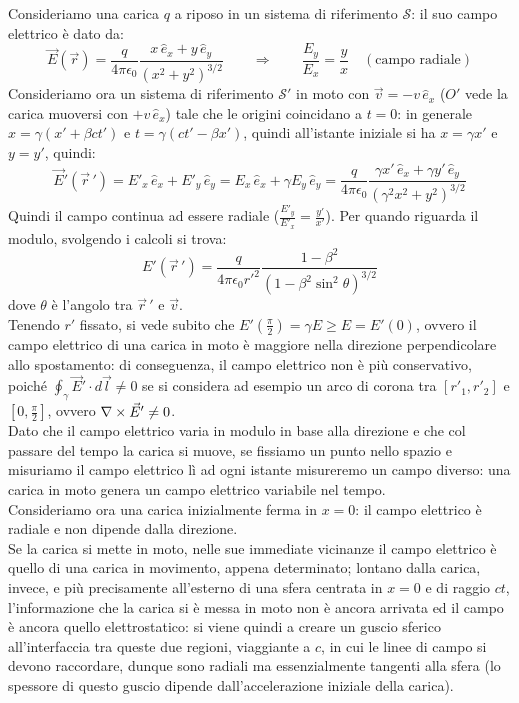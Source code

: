\documentclass[]{article}
\begin{document}
Consideriamo una carica $ q $ a riposo in un sistema di riferimento $	\mathcal{S} $: il suo campo elettrico è dato da:
\begin{equation}
	\vec{E}(\vec{r}) = \frac{q}{4\pi\epsilon_0} \frac{x\,\hat{e}_x + y\,\hat{e}_y}{(x^2+y^2)^{3/2}} \qquad\Longrightarrow\qquad \frac{E_y}{E_x} = \frac{y}{x} \quad (\text{campo radiale})
	\label{eq:30}
\end{equation} 
Consideriamo ora un sistema di riferimento $ \mathcal{S}' $ in moto con $ \vec{v} = -v\,\hat{e}_x $ ($ O' $ vede la carica muoversi con $ +v\,\hat{e}_x $) tale che le origini coincidano a $ t = 0 $: in generale $ x = \gamma (x' + \beta ct') $ e $ t = \gamma (ct' - \beta x') $, quindi all'istante iniziale si ha $ x = \gamma x' $ e $ y = y' $, quindi:
\begin{equation}
	\vec{E}'(\vec{r}\,') = E'_x\,\hat{e}_x + E'_y\,\hat{e}_y = E_x\,\hat{e}_x + \gamma E_y\,\hat{e}_y = \frac{q}{4\pi\epsilon_0} \frac{\gamma x' \,\hat{e}_x + \gamma y' \,\hat{e}_y}{(\gamma^2x^2+y^2)^{3/2}}
	\label{eq:31}
\end{equation}
Quindi il campo continua ad essere radiale ($ \frac{E'_y}{E'_x} = \frac{y'}{x'} $). Per quando riguarda il modulo, svolgendo i calcoli si trova:
\begin{equation}
	E'(\vec{r}\,') = \frac{q}{4\pi\epsilon_0 r'^2} \frac{1-\beta^2}{(1 - \beta^2\sin^2\theta)^{3/2}}
	\label{eq:32}
\end{equation}
dove $ \theta $ è l'angolo tra $ \vec{r}\,' $ e $ \vec{v} $. \\ 
%
Tenendo $ r' $ fissato, si vede subito che $ E'(\frac{\pi}{2}) = \gamma E \ge E = E'(0) $, ovvero il campo elettrico di una carica in moto è maggiore nella direzione perpendicolare allo spostamento: di conseguenza, il campo elettrico non è più conservativo, poiché $ \oint_{\gamma}\vec{E}'\cdot d\vec{l} \neq 0 $ se si considera ad esempio un arco di corona tra $ [r'_1,r'_2] $ e $ [0,\frac{\pi}{2}] $, ovvero $ \nabla\times\vec{E}' \neq 0 $. \\ 
%
Dato che il campo elettrico varia in modulo in base alla direzione e che col passare del tempo la carica si muove, se fissiamo un punto nello spazio e misuriamo il campo elettrico lì ad ogni istante misureremo un campo diverso: una carica in moto genera un campo elettrico variabile nel tempo. \\ 
%
Consideriamo ora una carica inizialmente ferma in $ x = 0 $: il campo elettrico è radiale e non dipende dalla direzione. \\Se la carica si mette in moto, nelle sue immediate vicinanze il campo elettrico è quello di una carica in movimento, appena determinato; lontano dalla carica, invece, e più precisamente all'esterno di una sfera centrata in $ x = 0 $ e di raggio $ ct $, l'informazione che la carica si è messa in moto non è ancora arrivata ed il campo è ancora quello elettrostatico: si viene quindi a creare un guscio sferico all'interfaccia tra queste due regioni, viaggiante a $ c $, in cui le linee di campo si devono raccordare, dunque sono radiali ma essenzialmente tangenti alla sfera (lo spessore di questo guscio dipende dall'accelerazione iniziale della carica). \\ 
\end{document}
